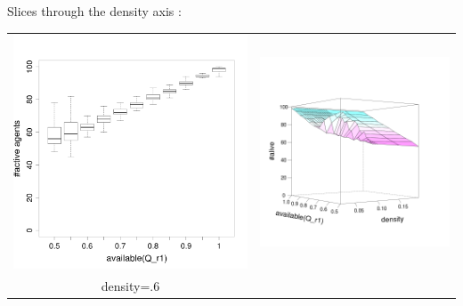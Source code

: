 \documentclass[8pt, handout=show,notes=show]{beamer}
\begin{document}
\begin{frame}{ Slices through the density axis : }
\begin{table}[H]
\begin{tabular}{cc}
			\includegraphics[width=\imgSize]{images/alive_r1_density-60.png}&
			\includegraphics[width=\imgSize]{images/active_median}\\
			density=.6&\\
		\end{tabular}

	\end{table}

\end{frame}
\end{document}
